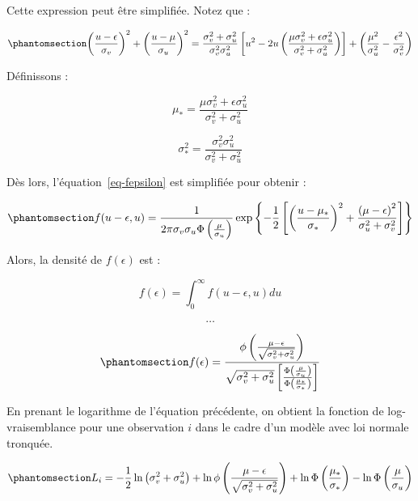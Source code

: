 \documentclass[
  12pt,
]{report}
\begin{document}
Cette expression peut être simplifiée. Notez que :

\begin{equation}\phantomsection\label{eq-fepsilon-2}{
\left(\frac{u-\epsilon}{\sigma_v}\right)^2 + \left(\frac{u-\mu}{\sigma_u}\right)^2 = \frac{\sigma^2_v + \sigma^2_u}{\sigma^2_v\sigma^2_u}\left[u^2 - 2u \left( \frac{\mu\sigma^2_v+\epsilon\sigma^2_u}{\sigma^2_v+\sigma^2_u}\right)\right] + \left(\frac{\mu^2}{\sigma^2_u}-\frac{\epsilon^2}{\sigma^2_v}\right)
}\end{equation}

Définissons :

\[
\mu_* = \frac{\mu\sigma^2_v+\epsilon\sigma^2_u}{\sigma^2_v+\sigma^2_u}
\]

\[
\sigma^2_* = \frac{\sigma^2_v\sigma^2_u}{\sigma^2_v + \sigma^2_u}
\]

Dès lors, l'équation~\ref{eq-fepsilon} est simplifiée pour obtenir :

\begin{equation}\phantomsection\label{eq-fepsilon-3}{
f(u-\epsilon, u) = \frac{1}{2\pi\sigma_v\sigma_u\Phi\left(\frac{\mu}{\sigma_u}\right)}\exp\left\{-\frac{1}{2}\left[\left(\frac{u-\mu_*}{\sigma_*}\right)^2+\frac{\left(\mu - \epsilon\right)^2}{\sigma^2_u+\sigma^2_v}\right]\right\}
}\end{equation}

Alors, la densité de \(f(\epsilon)\) est :

\[
f(\epsilon) = \int_0^{\infty}f(u-\epsilon, u)du
\]

\[
\dots
\]

\begin{equation}\phantomsection\label{eq-fepsilon-4}{
f(\epsilon) = \frac{\phi\left(\frac{\mu - \epsilon}{\sqrt{\sigma^2_v+\sigma^2_u}}\right)}{\sqrt{\sigma^2_v+\sigma^2_u}\left[\frac{\Phi\left(\frac{\mu}{\sigma_u}\right)}{\Phi\left(\frac{\mu_*}{\sigma_*}\right)}\right]}
}\end{equation}

En prenant le logarithme de l'équation précédente, on obtient la
fonction de log-vraisemblance pour une observation \(i\) dans le cadre
d'un modèle avec loi normale tronquée.

\begin{equation}\phantomsection\label{eq-log-likelihood}{
L_i = - \frac{1}{2}\ln\left(\sigma^2_v+\sigma^2_u\right) + \ln \phi \left(\frac{\mu - \epsilon}{\sqrt{\sigma^2_v+\sigma^2_u}}\right) + \ln \Phi \left(\frac{\mu_*}{\sigma_*}\right) - \ln \Phi\left(\frac{\mu}{\sigma_u}\right)
}\end{equation}
\end{document}
